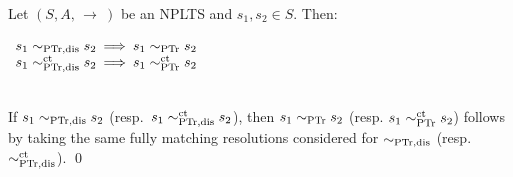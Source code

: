 \documentclass{LMCS}
\newcommand{\cws}[2]
	{\\ \centerline{$#2$} \\[-#1pt]}
\newcommand{\arrow}[2]
        {\, {\auxarrow\limits^{#1}}_{#2} \,}
\newcommand{\auxarrow}
{\mathop{\longrightarrow}}
\newcommand{\sbis}[1]
	{\sim_{#1}}
\begin{document}
	\begin{thm}\label{thm:ptrdis_incl_ptr}

Let $(S, A, \! \arrow{}{} \!)$ be an NPLTS and $s_{1}, s_{2} \in S$. Then:
\cws{11}{\begin{array}{rcl}
s_{1} \sbis{\rm PTr,dis} s_{2} & \!\!\! \Longrightarrow \!\!\! & s_{1} \sbis{\rm PTr} s_{2} \\
s_{1} \sbis{\rm PTr,dis}^{\rm ct} s_{2} & \!\!\! \Longrightarrow \!\!\! & s_{1} \sbis{\rm PTr}^{\rm ct}
s_{2} \\
\end{array}}

\proof
If $s_{1} \sbis{\rm PTr,dis} s_{2}$ (resp.\ $s_{1} \sbis{\rm PTr,dis}^{\rm ct} s_{2}$), then $s_{1}
\sbis{\rm PTr} s_{2}$ (resp. $s_{1} \sbis{\rm PTr}^{\rm ct} s_{2}$) follows by taking the same fully
matching resolutions considered for $\sbis{\rm PTr,dis}$ (resp.\ $\sbis{\rm PTr,dis}^{\rm ct}$).
\qed 

	\end{thm}
\end{document}
